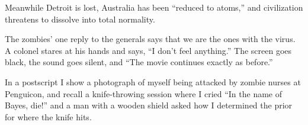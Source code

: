 Meanwhile Detroit is lost, Australia has been ``reduced to atoms,'' and civilization threatens to dissolve into total normality.

The zombies' one reply to the generals says that we are the ones with the virus. A colonel stares at his hands and says, ``I don't feel anything.'' The screen goes black, the sound goes silent, and ``The movie continues exactly as before.'' 

In a postscript I show a photograph of myself being attacked by zombie nurses at Penguicon, and recall a knife-throwing session where I cried ``In the name of Bayes, die!'' and a man with a wooden shield asked how I determined the prior for where the knife hits.
